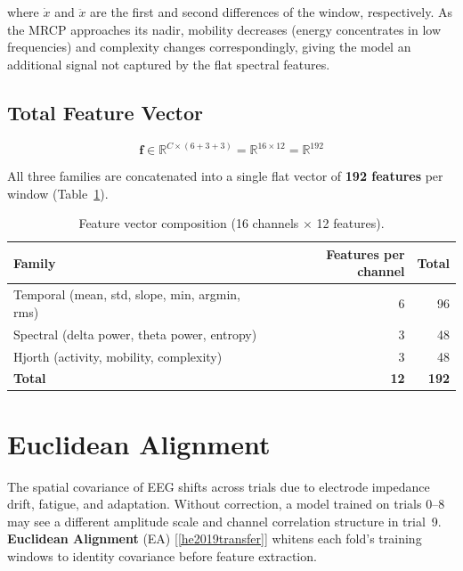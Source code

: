 \documentclass[12pt,a4paper]{article}
\begin{document}
where $\dot{x}$ and $\ddot{x}$ are the first and second differences of the
window, respectively. As the MRCP approaches its nadir, mobility decreases
(energy concentrates in low frequencies) and complexity changes
correspondingly, giving the model an additional signal not captured by
the flat spectral features.

\subsection{Total Feature Vector}

\[
  \mathbf{f} \in \mathbb{R}^{C \times (6 + 3 + 3)} = \mathbb{R}^{16 \times 12}
  = \mathbb{R}^{192}
\]

All three families are concatenated into a single flat vector of
\textbf{192 features} per window (Table~\ref{tab:features}).

\begin{table}[ht]
\centering
\caption{Feature vector composition (16 channels $\times$ 12 features).}
\label{tab:features}
\begin{tabular}{lrr}
\toprule
Family & Features per channel & Total \\
\midrule
Temporal (mean, std, slope, min, argmin, rms) & 6 & 96 \\
Spectral (delta power, theta power, entropy) & 3 & 48 \\
Hjorth (activity, mobility, complexity) & 3 & 48 \\
\midrule
\textbf{Total} & \textbf{12} & \textbf{192} \\
\bottomrule
\end{tabular}
\end{table}

\section{Euclidean Alignment}
\label{sec:ea}

The spatial covariance of EEG shifts across trials due to electrode
impedance drift, fatigue, and adaptation. Without correction, a model
trained on trials 0--8 may see a different amplitude scale and channel
correlation structure in trial~9. \textbf{Euclidean Alignment} (EA)
[\ref{he2019transfer}] whitens each fold's training windows to identity
covariance before feature extraction.
\end{document}
